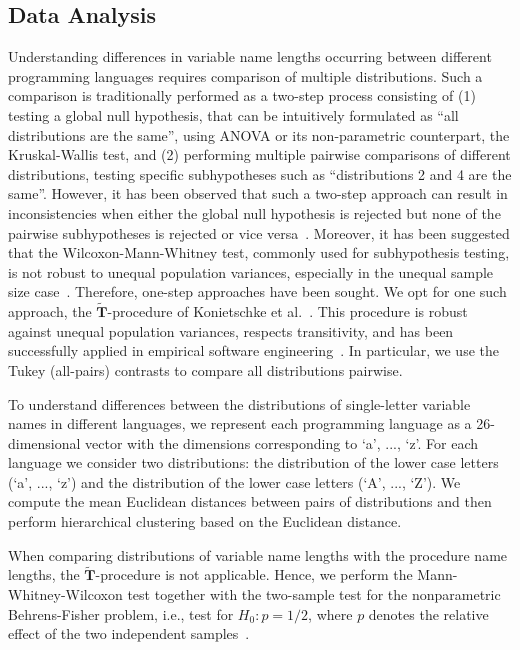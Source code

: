\documentclass[conference]{IEEEtran}
\begin{document}
\subsection{Data Analysis}
\label{sec:da}
Understanding differences in variable name lengths occurring between different programming languages requires comparison of multiple distributions. 
Such a comparison is traditionally performed as a two-step process consisting of (1) testing a global null hypothesis, that can be intuitively formulated as ``all distributions are the same'', using ANOVA or its non-parametric counterpart, the Kruskal-Wallis test, and (2) performing multiple pairwise comparisons of different distributions, testing specific subhypotheses such as ``distributions 2 and 4 are the same''. 
However, it has been observed that such a two-step approach can result in inconsistencies when either the global null hypothesis is rejected but none of the pairwise subhypotheses is rejected or vice versa~\cite{Gabriel}. 
Moreover, it has been suggested that the Wilcoxon-Mann-Whitney test, commonly used for subhypothesis testing, is not robust to unequal population variances, especially in the unequal sample size case~\cite{Zimmerman:Zumbo}.
Therefore, one-step approaches have been sought.
We opt for one such approach, the $\widetilde{\mathbf{T}}$-procedure of Konietschke et al.~\cite{Konietschke:Hothorn:Brunner,Konietschke:nparcomp}. 
This procedure is robust against unequal population variances, respects transitivity, and has been successfully applied in empirical software engineering~\cite{VasilescuSGM14,VasilescuCS14,YuWYW16}.
In particular, we use the Tukey (all-pairs) contrasts to compare all distributions pairwise.

To understand differences between the distributions of single-letter variable names in different languages, we represent each programming language as a 26-dimensional vector with the dimensions corresponding to `a', ..., `z'.
For each language we consider two distributions: the distribution of the lower case letters (`a', ..., `z') and the distribution of the lower case letters (`A', ..., `Z').
We compute the mean Euclidean distances between pairs of distributions and then  perform hierarchical clustering based on the Euclidean distance.

When comparing distributions of variable name lengths with the procedure name lengths, the $\widetilde{\mathbf{T}}$-procedure is not applicable.
Hence, we perform the Mann-Whitney-Wilcoxon test together with the two-sample test for the nonparametric Behrens-Fisher problem, i.e., test for
$H_0: p = 1/2$, where $p$ denotes the relative effect of the two independent samples~\cite{Neubert,Konietschke:nparcomp}.
\end{document}
